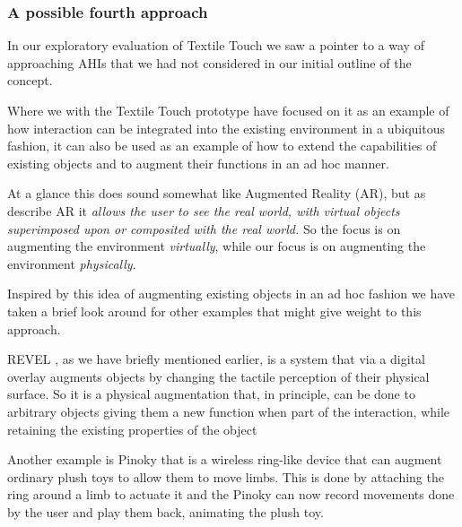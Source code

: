 \subsubsection{A possible fourth approach}

In our exploratory evaluation of Textile Touch we saw a pointer to a way of approaching AHIs that we had not considered in our initial outline of the concept.

Where we with the Textile Touch prototype have focused on it as an example of how interaction can be integrated into the existing environment in a ubiquitous fashion, it can also be used as an example of how to extend the capabilities of existing objects and to augment their functions in an ad hoc manner.

At a glance this does sound somewhat like Augmented Reality (AR), but as \citet{azuma1997survey} describe AR it \emph{allows the user to see the real world, with virtual objects superimposed upon or composited with the real world.}
So the focus is on augmenting the environment \emph{virtually}, while our focus is on augmenting the environment \emph{physically}.


Inspired by this idea of augmenting existing objects in an ad hoc fashion we have taken a brief look around for other examples that might give weight to this approach.

REVEL \citep{bau2013revel}, as we have briefly mentioned earlier, is a system that via a digital overlay augments objects by changing the tactile perception of their physical surface.
So it is a physical augmentation that, in principle, can be done to arbitrary objects giving them a new function when part of the interaction, while retaining the existing properties of the object 

Another example is Pinoky \citep{sugiura2012pinoky} that is a wireless ring-like device that can augment ordinary plush toys to allow them to move limbs.
This is done by attaching the ring around a limb to actuate it and the Pinoky can now record movements done by the user and play them back, animating the plush toy.

